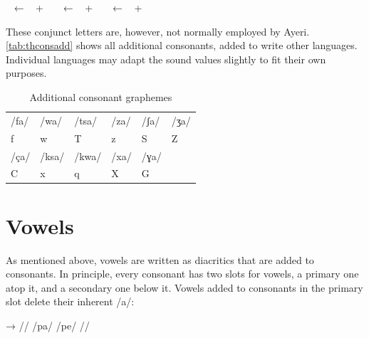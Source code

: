 \pex
	\a {}~ ← ~ + 
		~
	\a {}~ ← ~ + 
		~
	\a {}~ ← ~ + 
		~
\xe

These conjunct letters are, however, not normally employed by Ayeri.
\autoref{tab:thconsadd} shows all additional consonants, added to write other
languages. Individual languages may adapt the sound values slightly to fit
their own purposes.

\begin{table}[t]
\caption{Additional consonant graphemes}

\begin{tabu} to \linewidth{X[c] X[c] X[c] X[c] X[c] X[c]}
\toprule
\tableheaderfont	/fa/ & /wa/ & /tsa/ & /za/ & /ʃa/ & /ʒa/ \\
\rowfont{\Tagati\huge}	f & w & T & z & S & Z \\

\midrule

\tableheaderfont	/ça/ & /ksa/ & /kwa/ & /xa/ & /ɣa/ \\
\rowfont{\Tagati\huge}	C & x & q & X & G \\

\bottomrule
\end{tabu}
\label{tab:thconsadd}
\end{table}


\section{Vowels}

As mentioned above, vowels are written as diacritics that are added to 
consonants. In principle, every consonant has two slots for vowels, a primary 
one atop it, and a secondary one below it. Vowels added to consonants in 
the primary slot delete their inherent /a/:

\ex[lingstyle=thex]\begingl
	\gla {}	→	 //
	\glb /pa/	{}	/pe/ //
\endgl\xe

